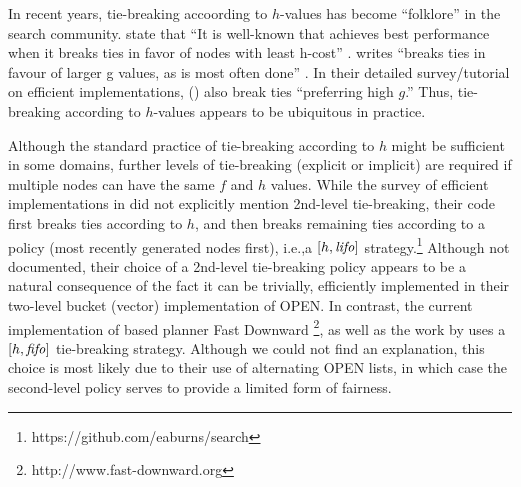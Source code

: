 In recent years, tie-breaking accoording to $h$-values has become ``folklore'' in the search community.
\citeauthor{hansen2007anytime} state that ``It is well-known 
that \astar achieves best performance when it breaks ties
in favor of nodes with least h-cost'' \cite{hansen2007anytime}.
\citeauthor{holte2010common} writes ``\astar breaks ties in favour
of larger g values, as is most often done'' \cite[note that since $f=g+h$,
preferring large $g$ is equivalent to preferring smaller $h$]{holte2010common}.
In their detailed survey/tutorial on efficient \astar implementations,
\citeauthor{burns2012implementing} (\citeyear{burns2012implementing})
also break ties ``preferring high $g$.''
Thus, tie-breaking according to $h$-values appears
to be ubiquitous in practice.


Although the standard practice of tie-breaking according to $h$ might be
sufficient in some domains, further levels of tie-breaking (explicit or
implicit) are required if multiple nodes can have the same $f$ and
$h$ values.
While the survey of efficient \astar implementations in \citeauthor{burns2012implementing} did not explicitly mention 2nd-level tie-breaking, their code first breaks ties according to $h$, and then breaks remaining ties according to a \lifo policy (most recently generated nodes first), i.e.,a $[h,\mbox{\textit{lifo}}]$ strategy.\footnote{https://github.com/eaburns/search}
Although not documented, their choice of a \lifo 2nd-level tie-breaking policy appears to be a natural consequence of the fact it can be trivially, efficiently implemented in their two-level bucket (vector) implementation of OPEN.
In contrast, the current implementation of \sota \astar based planner Fast
Downward \cite{Helmert2006}\footnote{http://www.fast-downward.org}, as well as 
the work by \cite{RogerH10} uses a $[h,\mbox{\textit{fifo}}]$ tie-breaking strategy.
Although we could not find an explanation, this choice is most likely due to their use of alternating OPEN lists, in which case the \fifo second-level policy serves to provide a limited form of fairness.



